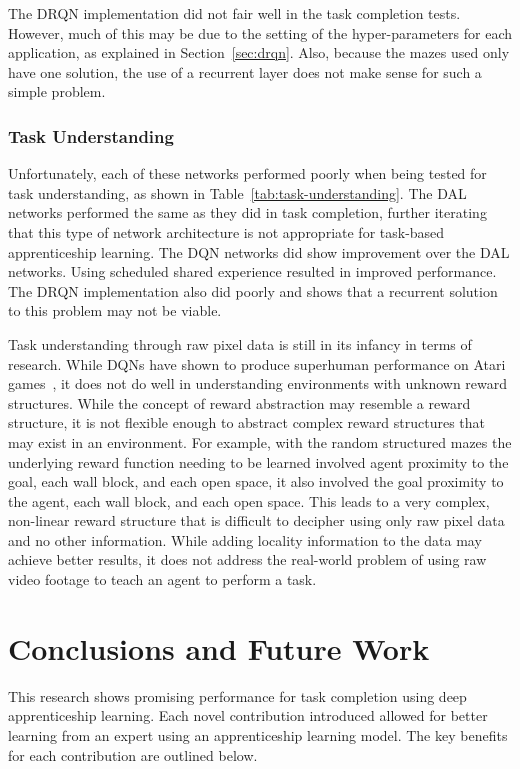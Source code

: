 \documentclass[12pt,american]{report}
\begin{document}
The DRQN implementation did not fair well in the task completion tests. However, much of this may be due to the setting of the hyper-parameters for each application, as explained in Section~\ref{sec:drqn}.  Also, because the mazes used only have one solution, the use of a recurrent layer does not make sense for such a simple problem.

\subsection{Task Understanding}
Unfortunately, each of these networks performed poorly when being tested for task understanding, as shown in Table~\ref{tab:task-understanding}.  The DAL networks performed the same as they did in task completion, further iterating that this type of network architecture is not appropriate for task-based apprenticeship learning. The DQN networks did show improvement over the DAL networks.  Using scheduled shared experience resulted in improved performance.  The DRQN implementation also did poorly and shows that a recurrent solution to this problem may not be viable. 

Task understanding through raw pixel data is still in its infancy in terms of research.  While DQNs have shown to produce superhuman performance on Atari games~\cite{atari}, it does not do well in understanding environments with unknown reward structures.  While the concept of reward abstraction may resemble a reward structure, it is not flexible enough to abstract complex reward structures that may exist in an environment.  For example, with the random structured mazes the underlying reward function needing to be learned involved agent proximity to the goal, each wall block, and each open space, it also involved the goal proximity to the agent, each wall block, and each open space.  This leads to a very complex, non-linear reward structure that is difficult to decipher using only raw pixel data and no other information.  While adding locality information to the data may achieve better results, it does not address the real-world problem of using raw video footage to teach an agent to perform a task. 


\chapter{Conclusions and Future Work}
\label{sec:conclusions}
This research shows promising performance for task completion using deep apprenticeship learning.  Each novel contribution introduced allowed for better learning from an expert using an apprenticeship learning model.  The key benefits for each contribution are outlined below. 
\end{document}
